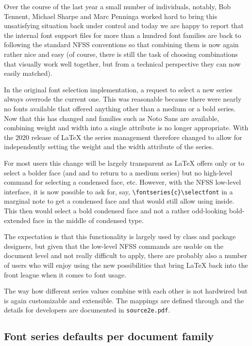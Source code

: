 \documentclass{ltnews}
\begin{document}
Over the course of the last year a small number of individuals,
notably, Bob Tennent, Michael Sharpe and Marc Penninga worked hard to
bring this unsatisfying situation back under control and today we are
happy to report that the internal font support files for more than a
hundred font families are back to following the standard NFSS conventions
so that combining them is now again rather nice and easy (of course,
there is still the task of choosing combinations that visually work
well together, but from a technical perspective they can now easily
matched).


In the original font selection implementation, a request to select a new series
always overrode the current one. This was reasonable because there
were nearly no fonts available that offered anything other than a
medium or a bold series. Now that this has changed and families such
as Noto Sans are available, combining weight and width into a single
attribute is no longer appropriate. With the 2020 release of \LaTeX{}
the series management therefore changed to allow for independently
setting the weight and the width attribute of the series.

For most users this change will be largely transparent as \LaTeX{}
offers only  or  to select a bolder face (and
 and  to return to a medium series) but no
high-level command for selecting a condensed face, etc. However, with
the NFSS low-level interface, it is now possible to ask for, say,
\verb=\fontseries{c}\selectfont= in a marginal note to get a condensed
face and that would still allow  using  inside. This then would
select a bold condensed face and not a rather odd-looking
bold-extended face in the middle of condensed type.

The expectation is that this functionality is largely used by class and package
designers, but given that the low-level NFSS commands are usable on
the document level and not really difficult to apply, there are
probably also a number of users who will enjoy using the new
possibilities that bring \LaTeX{} back into the front league when it
comes to font usage.

The way how different series values combine with each other is not
hardwired but is again customizable and extensible. The mappings are
defined through  and the details for
developers are documented in \texttt{source2e.pdf}.



\subsection{Font series defaults per document family}
\end{document}
